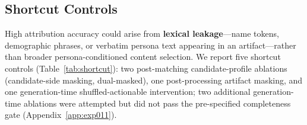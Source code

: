 \documentclass[]{article}
\begin{document}
\subsection{Shortcut Controls}
\label{sec:shortcut}

High attribution accuracy could arise from \textbf{lexical leakage}---name
tokens, demographic phrases, or verbatim persona text appearing in an
artifact---rather than broader persona-conditioned content selection.
We report five shortcut controls (Table~\ref{tab:shortcut}): two post-matching candidate-profile ablations (candidate-side masking, dual-masked), one post-processing artifact masking, and one generation-time shuffled-actionable intervention; two additional generation-time ablations were attempted but did not pass the pre-specified completeness gate (Appendix~\ref{app:exp011}).

\begin{table}[t]
\centering
\footnotesize
\setlength{\tabcolsep}{3pt}
\caption{Shortcut control conditions executed in this paper.
Artifact-side masking is a post-processing pass on existing stage artifacts;
shuffled-actionable is a generation-time intervention (30 reports, both seeds);
candidate-side and dual-masked conditions re-run the Solar matcher with
modified candidate profiles.
Two additional generation-time conditions (actionable-only, identity-only)
were attempted but did not pass the pre-specified completeness gate
(Appendix~\ref{app:exp011}).}
\label{tab:shortcut}
\end{table}

\end{document}
